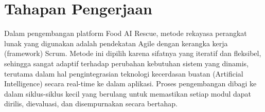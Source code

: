 
\section{Tahapan Pengerjaan}
Dalam pengembangan platform Food AI Rescue, metode rekayasa perangkat lunak yang digunakan adalah pendekatan Agile dengan kerangka kerja (framework) Scrum. Metode ini dipilih karena sifatnya yang iteratif dan fleksibel, sehingga sangat adaptif terhadap perubahan kebutuhan sistem yang dinamis, terutama dalam hal pengintegrasian teknologi kecerdasan buatan (Artificial Intelligence) secara real-time ke dalam aplikasi. Proses pengembangan dibagi ke dalam siklus-siklus kecil yang berulang untuk memastikan setiap modul dapat dirilis, dievaluasi, dan disempurnakan secara bertahap.

